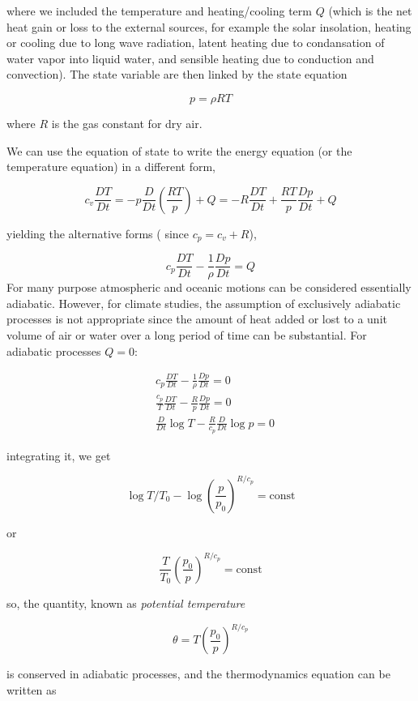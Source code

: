 where we included the temperature and heating/cooling term \(Q\) (which is the net heat gain or loss to the external sources, for example the solar insolation, heating or cooling due to long wave radiation, latent heating due to condansation of water vapor into liquid water, and sensible heating due to conduction and convection). The state variable are then linked by the state equation

\[p = \rho R T\]

where \(R\) is the gas constant for dry air.

We can use the equation of state to write the energy equation (or the temperature equation) in a different form,

\[c_v\frac{D T}{Dt} = -p\frac{D }{Dt}\left(\frac{R T}{p}\right)+ Q = -R\frac{D T}{Dt} + \frac{RT}{p}\frac{D p}{Dt} + Q\]

yielding the alternative forms ( since \(c_p = c_v +R\)),

\[c_p\frac{D T}{Dt}  - \frac{1}{\rho}\frac{D p}{Dt} = Q\]
For many purpose atmospheric and oceanic motions can be considered essentially adiabatic. However, for climate studies, the assumption of exclusively adiabatic processes is not appropriate since the amount of heat added or lost to a unit volume of air or water over a long period of time can be substantial. For adiabatic processes \(Q=0\):

\[\begin{aligned}
&c_p\frac{D T}{Dt}  - \frac{1}{\rho}\frac{D p}{Dt} = 0\\
&\frac{c_p}{T}\frac{D T}{Dt} -\frac{R}{p}\frac{D p}{Dt} = 0\\
&\frac{D }{Dt}\log{T} - \frac{R}{c_p}\frac{D }{Dt}\log{p} = 0
\end{aligned}\]

integrating it, we get

\begin{equation}\label{eq333}
    \log{T/T_0} - \log{\left(\frac{p}{p_0}\right)^{R/c_p}} = \text{const}
\end{equation}

or

\[\frac{T}{T_0}\left(\frac{p_0}{p}\right)^{R/c_p} = \text{const}\]

so, the quantity, known as \emph{potential temperature}

\[\theta = T\left(\frac{p_0}{p}\right)^{R/c_p}\]

is conserved in adiabatic processes, and the thermodynamics equation can be written as

